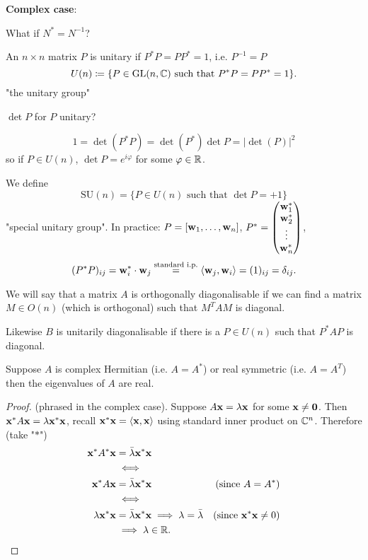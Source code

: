 \documentclass[10pt, a4paper]{article}
\begin{document}
\textbf{Complex case}:

What if $N ^ {*} = N ^ {-1}$?

\begin{definition}[Unitary]
    An $n \times n$ matrix $P$ is unitary if $P ^ {*}P = PP ^ {*} = 1$,
    i.e. $P ^ {-1} = P$
    \[
    U(n) \coloneqq \{P \in \mathrm{GL}(n, \mathbb{C})\text{ such that } P ^ {*}P = PP ^ {*} = 1\}.
    \]
    "the unitary group"
\end{definition}

$\det{P}$ for $P$ unitary?

\[
1 = \det(P ^ {*}P) = \det(P ^ {*})\det{P} = |\det(P)| ^ 2
\]
so if $P \in U(n)$,
$\det{P} = e ^ {i\varphi}$ for some $\varphi \in \mathbb{R}$.

We define
\[
\mathrm{SU}(n) = \{P \in U(n) \text{ such that } \det{P} = +1\}
\]
"special unitary group".
In practice:
$P = [\mathbf{w}_1, \dotsc, \mathbf{w}_n]$,
$P ^ {*} = \begin{pmatrix}
    \mathbf{w}_1 ^ {*} \\
    \mathbf{w}_2 ^ {*} \\
    \vdots \\
    \mathbf{w}_n ^ {*}
\end{pmatrix}$,
\[
(P ^ {*}P)_{ij} = \mathbf{w}_i ^ {*} \cdot \mathbf{w}_j \overset{\text{standard i.p.}}{=} \langle\mathbf{w}_j, \mathbf{w}_i\rangle = (1)_{ij} = \delta_{ij}.
\]

We will say that a matrix $A$ is orthogonally diagonalisable if we can find a matrix $M \in O(n)$
(which is orthogonal)
such that $M ^ TAM$ is diagonal.

Likewise $B$ is unitarily diagonalisable if there is a $P \in U(n)$  such that $P ^ {*}AP$ is diagonal.

\begin{proposition}
    Suppose $A$ is complex Hermitian
    (i.e. $A = A ^ {*}$)
    or real symmetric
    (i.e. $A = A ^ T$)
    then the eigenvalues of $A$ are real.

    \begin{proof}
        (phrased in the complex case).
        Suppose $A\mathbf{x} = \lambda\mathbf{x}$ for some $\mathbf{x} \neq \mathbf{0}$.
        Then $\mathbf{x} ^ {*}A\mathbf{x} = \lambda\mathbf{x} ^ {*}\mathbf{x}$,
        recall $\mathbf{x} ^ {*}\mathbf{x} = \langle\mathbf{x}, \mathbf{x}\rangle$ using standard inner product on $\mathbb{C} ^ n$.
        Therefore
        (take "$*$")
        \begin{align*}
            \mathbf{x} ^ {*}A ^ {*}\mathbf{x} &= \bar{\lambda}\mathbf{x} ^ {*}\mathbf{x} \\
            &\iff \\
            \mathbf{x} ^ {*}A\mathbf{x} &= \bar{\lambda}\mathbf{x} ^ {*}\mathbf{x} &(\text{since $A = A ^ {*}$}) \\
            &\iff \\
            \lambda\mathbf{x} ^ {*}\mathbf{x} &= \bar{\lambda}\mathbf{x} ^ {*}\mathbf{x} \implies \lambda = \bar{\lambda} &(\text{since $\mathbf{x} ^ {*}\mathbf{x} \neq 0$}) \\
            &\implies \lambda \in \mathbb{R}.
        \end{align*}
    \end{proof}
\end{proposition}
\end{document}
